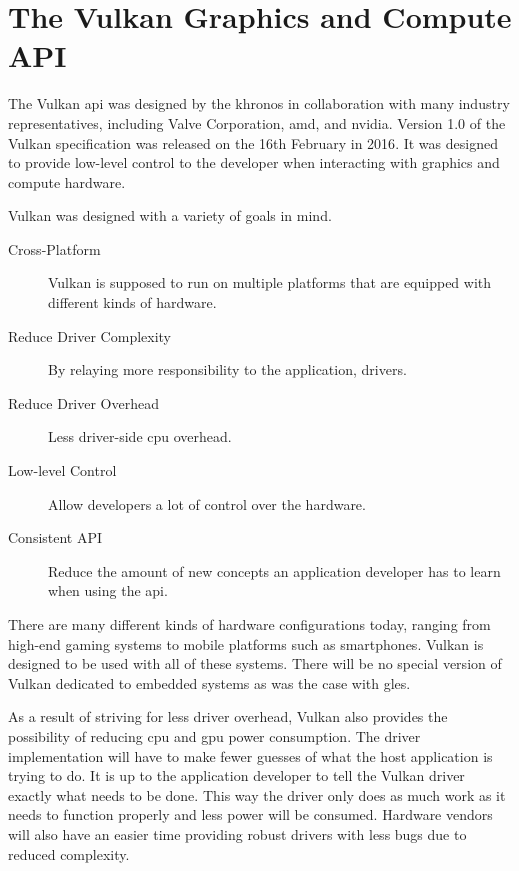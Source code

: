 


  \section{The Vulkan Graphics and Compute API}
    The Vulkan \gls{api} was designed by the \gls{khronos} in collaboration with many industry representatives, including Valve Corporation, \gls{amd}, and \gls{nvidia}\cite{vkspec}.
    Version 1.0 of the Vulkan specification was released on the 16th February in 2016\cite{vkrelease1dot0}.
    It was designed to provide low-level control to the developer when interacting with graphics and compute hardware.

    Vulkan was designed with a variety of goals in mind.

    \begin{description}
      \item[Cross-Platform] Vulkan is supposed to run on multiple platforms that are equipped with different kinds of hardware.
      \item[Reduce Driver Complexity] By relaying more responsibility to the application, drivers.
      \item[Reduce Driver Overhead] Less driver-side \gls{cpu} overhead.
      \item[Low-level Control] Allow developers a lot of control over the hardware.
      \item[Consistent API] Reduce the amount of new concepts an application developer has to learn when using the \gls{api}.
    \end{description}

    There are many different kinds of hardware configurations today, ranging from high-end gaming systems to mobile platforms such as smartphones.
    Vulkan is designed to be used with all of these systems.
    There will be no special version of Vulkan dedicated to embedded systems as was the case with \gls{gles}.

    As a result of striving for less driver overhead, Vulkan also provides the possibility of reducing \gls{cpu} and \gls{gpu} power consumption.
    The driver implementation will have to make fewer guesses of what the host application is trying to do.
    It is up to the application developer to tell the Vulkan driver exactly what needs to be done.
    This way the driver only does as much work as it needs to function properly and less power will be consumed.
    Hardware vendors will also have an easier time providing robust drivers with less bugs due to reduced complexity.

